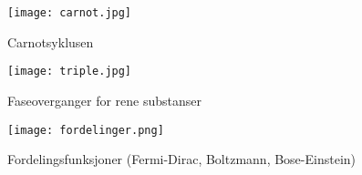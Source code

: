 \documentclass{article}
\begin{document}
\begin{figure}[h]
\centering
\texttt{[image: carnot.jpg]}
\caption{Carnotsyklusen}
\end{figure}
\begin{figure}[h]
\centering
\texttt{[image: triple.jpg]}
\caption{Faseoverganger for rene substanser}
\end{figure}
\begin{figure}[h]
\centering
\texttt{[image: fordelinger.png]}
\caption{Fordelingsfunksjoner (Fermi-Dirac, Boltzmann, Bose-Einstein)}
\end{figure}

 
\end{document}
